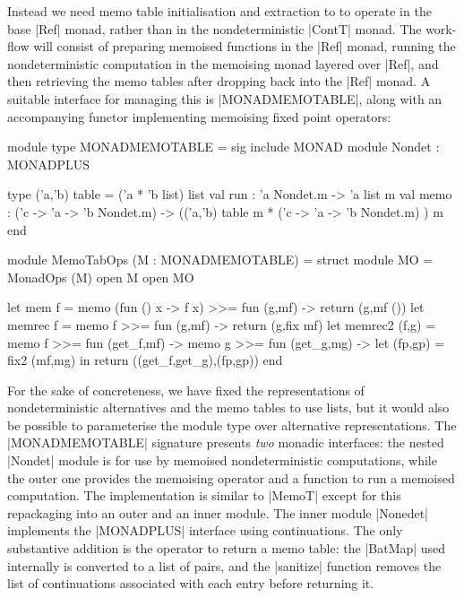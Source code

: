 Instead we need memo table initialisation and extraction to
to operate in the base |Ref| monad, rather than in the nondeterministic 
|ContT| monad. The work-flow will consist of preparing
memoised functions in the |Ref| monad, running the nondeterministic 
computation in the memoising monad layered over |Ref|, and then retrieving
the memo tables after dropping back into the |Ref| monad. A suitable
interface for managing this is |MONADMEMOTABLE|, along with
an accompanying functor implementing memoising fixed point operators:
\begin{ocaml}
	module type MONADMEMOTABLE = sig
		include MONAD
		module Nondet : MONADPLUS

		type ('a,'b) table = ('a * 'b list) list
		val run : 'a Nondet.m -> 'a list m
		val memo : ('c -> 'a -> 'b Nondet.m) -> 
							 (('a,'b) table m * ('c -> 'a -> 'b Nondet.m) ) m
	end

	module MemoTabOps (M : MONADMEMOTABLE) = struct
		module MO = MonadOps (M)
		open M
		open MO

		let mem f = memo (fun () x -> f x) >>= fun (g,mf) -> return (g,mf ())
		let memrec f = memo f >>= fun (g,mf) -> return (g,fix mf)
		let memrec2 (f,g) = memo f >>= fun (get_f,mf) ->
		                     memo g >>= fun (get_g,mg) ->
		                     let (fp,gp) = fix2 (mf,mg) in
		                     return ((get_f,get_g),(fp,gp))
	end
\end{ocaml}
For the sake of concreteness, we have fixed the representations
of nondeterministic alternatives and the memo tables to use lists,
but it would also be possible to parameterise the module type over alternative
representations. The |MONADMEMOTABLE| signature presents \emph{two}
monadic interfaces: the nested |Nondet| module is for use by memoised
nondeterministic computations, while the outer one provides the
memoising operator and a function to run a memoised computation.
The implementation is similar to |MemoT| except for this repackaging
into an outer and an inner module. The inner module |Nonedet| implements
the |MONADPLUS| interface using continuations. The only substantive addition is the
operator to return a memo table: the |BatMap| used internally is
converted to a list of pairs, and the
|sanitize| function removes the list of continuations associated with each 
entry before returning it.
